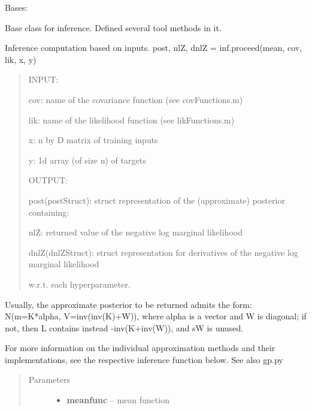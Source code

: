 \documentclass[letterpaper,10pt,english]{sphinxmanual}
\begin{document}
\begin{fulllineitems}
\label{pyGPs.Core:pyGPs.Core.inf.Inference}
Bases: 

Base class for inference. Defined several tool methods in it.

\begin{fulllineitems}
\label{pyGPs.Core:pyGPs.Core.inf.Inference.proceed}
Inference computation based on inputs.
post, nlZ, dnlZ = inf.proceed(mean, cov, lik, x, y)
\begin{quote}

\begin{DUlineblock}{0em}
\item[] INPUT:
\item[] cov: name of the covariance function (see covFunctions.m)
\item[] lik: name of the likelihood function (see likFunctions.m)
\item[] x: n by D matrix of training inputs 
\item[] y: 1d array (of size n) of targets
\end{DUlineblock}

\begin{DUlineblock}{0em}
\item[] OUTPUT:
\item[] post(postStruct): struct representation of the (approximate) posterior containing: 
\item[] nlZ: returned value of the negative log marginal likelihood
\item[] dnlZ(dnlZStruct): struct representation for derivatives of the negative log marginal likelihood
\item[] w.r.t. each hyperparameter.
\end{DUlineblock}
\end{quote}

Usually, the approximate posterior to be returned admits the form: 
N(m=K*alpha, V=inv(inv(K)+W)), where alpha is a vector and W is diagonal;
if not, then L contains instead -inv(K+inv(W)), and sW is unused.

For more information on the individual approximation methods and their
implementations, see the respective inference function below. See also gp.py
\begin{quote}\begin{description}
\item[{Parameters}] \leavevmode\begin{itemize}
\item {} 
\textbf{meanfunc} -- mean function


\end{itemize}
\end{description}
\end{quote}
\end{fulllineitems}
\end{fulllineitems}
\end{document}
